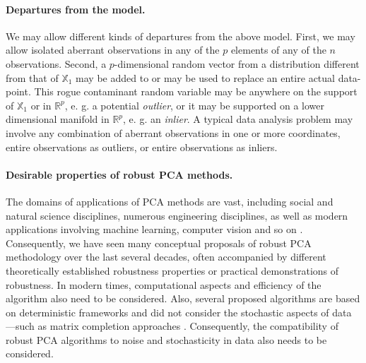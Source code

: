 \documentclass[ss]{imsart}
\newcommand{\BR}{{\mathbb{R}}}
\newcommand{\BX}{{\mathbb{X}}}
\theoremstyle{Example}
\newcommand{\attention}[1]{{\color{red}{\textbf{[ATTENTION:#1]}}}}
\begin{document}
\paragraph{Departures from the model.}
We may allow different kinds of departures from the above model. First, we may allow isolated aberrant observations in any of the $p$ elements of any of the $n$ observations. Second, a $p$-dimensional random vector from a distribution different from that of $\BX_{1}$ may be added to or may be used to replace an entire actual data-point. This rogue contaminant random variable may be anywhere on the support of $\BX_{1}$ or in $\BR^{p}$, e. g. a potential \textit{outlier}, or it may be supported on a lower dimensional manifold in $\BR^{p}$, e. g. an \textit{inlier}. A typical data analysis problem may involve any combination of aberrant observations in one or more coordinates, entire observations as outliers, or entire observations as inliers. 


\paragraph{Desirable properties of robust PCA methods.}
The domains of applications of PCA methods are vast, including social and natural science disciplines, numerous engineering disciplines, as well as modern applications involving machine learning, computer vision and so on \cite{AlkandariAljaber15,AlexanderBook,WilksBook,BerryCastellanos}. %
Consequently, we have seen many conceptual proposals of robust PCA methodology over the last several decades, often accompanied by different theoretically established robustness properties or practical demonstrations of robustness. In modern times, computational aspects and efficiency of the algorithm also need to be considered. Also, several proposed algorithms are based on deterministic frameworks and did not consider the stochastic aspects of data
{\color{red}
---such as matrix completion approaches \cite{CandesTao10,Vaswani}}. Consequently, the compatibility of robust PCA algorithms to noise and stochasticity in data also needs to be considered. %
\end{document}
